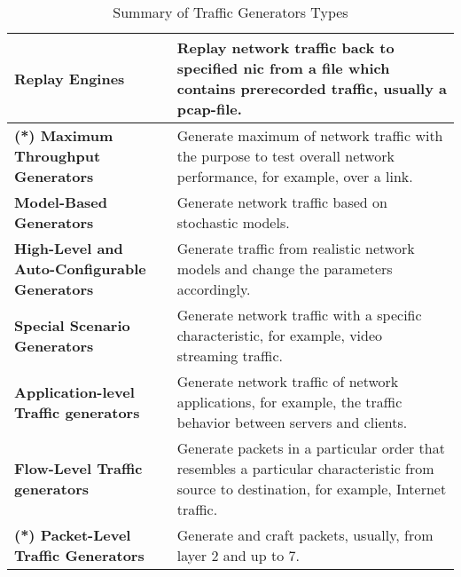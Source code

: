 \begin{table}[ht!]
    \scriptsize
    \caption{Summary of Traffic Generators Types \cite{botta2010you, molnar2013validate}}
    \label{types}
    \begin{adjustbox}{center}
        \renewcommand*\arraystretch{1.5}\begin{tabular}{| L{5cm} | L{8cm} |}
            \hline
            \textbf{Replay Engines} & Replay network traffic back to specified \gls{nic} from a file which contains prerecorded traffic, usually a pcap-file.
            \\ \hline
            \textbf{(*) Maximum Throughput Generators} & Generate maximum of network traffic with the purpose to test overall network performance, for example, over a link.
            \\ \hline
            \textbf{Model-Based Generators} & Generate network traffic based on stochastic models.
            \\ \hline
            \textbf{High-Level and Auto-Configurable Generators} & Generate traffic from realistic network models and change the parameters accordingly.
            \\ \hline
            \textbf{Special Scenario Generators} & Generate network traffic with a specific characteristic, for example, video streaming traffic.
            \\ \hline \hline
            \textbf{Application-level Traffic generators} & Generate network traffic of network applications, for example, the traffic behavior between servers and clients.
            \\ \hline
            \textbf{Flow-Level Traffic generators} & Generate packets in a particular order that resembles a particular characteristic from source to destination, for example, Internet traffic.
            \\ \hline
            \textbf{(*) Packet-Level Traffic Generators} & Generate and craft packets, usually, from layer 2 and up to 7.
            \\ \hline
        \end{tabular}
    \end{adjustbox}
\end{table}
